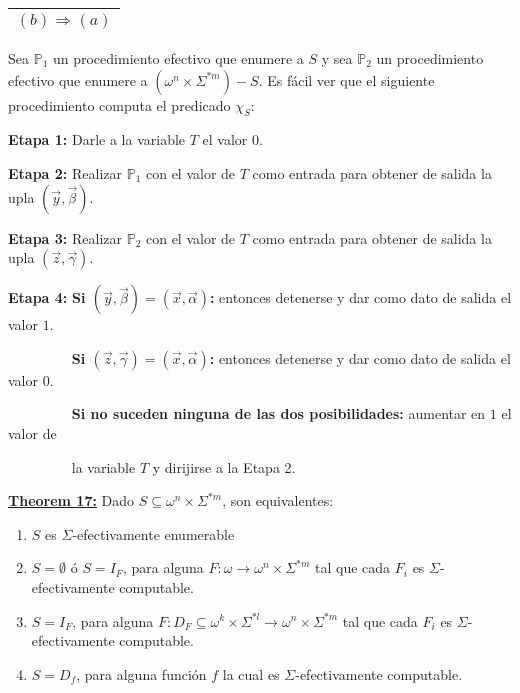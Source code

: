     \vspace{3mm}
    \begin{tabular}{|c|}\hline $(b) \Rightarrow (a)$\\\hline\end{tabular} Sea $\mathbb{P}_{1}$ un procedimiento
      efectivo que enumere a $S$ y sea $\mathbb{P}_{2}$ un procedimiento efectivo que enumere a
      $(\omega^{n}\times \Sigma^{\ast m})-S$. Es fácil ver que el siguiente procedimiento computa el predicado
      $\chi _{S}$:

    \vspace{3mm}
    \textbf{Etapa 1:}
    Darle a la variable $T$ el valor $0$.

    \textbf{Etapa 2:}
    Realizar $\mathbb{P}_{1}$ con el valor de $T$ como entrada para obtener de salida la upla $(\vec{y}, \vec{\beta})$.

    \textbf{Etapa 3:}
    Realizar $\mathbb{P}_{2}$ con el valor de $T$ como entrada para obtener de salida la upla $(\vec{z}, \vec{\gamma})$.

    \textbf{Etapa 4:}
    \textbf{Si $(\vec{y}, \vec{\beta}) = (\vec{x}, \vec{\alpha})$:} entonces detenerse y dar como dato de salida el
    valor $1$.

    $\qquad\qquad\;\;$\textbf{Si $(\vec{z}, \vec{\gamma}) = (\vec{x}, \vec{\alpha})$:} entonces detenerse y dar como
    dato de salida el valor $0$.


    $\qquad\qquad\;\;$\textbf{Si no suceden ninguna de las dos posibilidades:} aumentar en $1$ el valor de

    $\qquad\qquad\;\;$la variable $T$ y dirijirse a la Etapa 2.

  \QED


  \textbf{\underline{Theorem 17:}} Dado $S \subseteq \omega^{n}\times \Sigma^{\ast m}$, son equivalentes:

    \begin{enumerate}
      \item $S$ es $\Sigma$-efectivamente enumerable
      \item $S = \emptyset$ ó $S = I_{F}$, para alguna $F:\omega \rightarrow \omega^{n} \times \Sigma^{\ast m}$ tal que
      cada $F_{i}$ es $\Sigma$-efectivamente computable.
      \item $S = I_{F}$, para alguna $F:D_{F} \subseteq \omega^{k} \times \Sigma^{\ast l} \rightarrow \omega^{n} \times
      \Sigma^{\ast m}$ tal que cada $F_{i}$ es $\Sigma$-efectivamente computable.
      \item $S = D_{f}$, para alguna función $f$ la cual es $\Sigma$-efectivamente computable.
    \end{enumerate}

